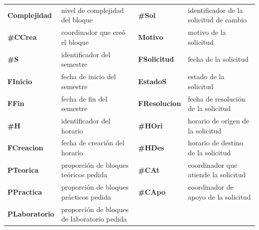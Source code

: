 {\begin{xltabular}{\linewidth}{>{\bfseries}l L{1}>{\bfseries}l L{1}}
Complejidad & nivel de complejidad del bloque & \#Sol & identificador de la solicitud de cambio \\
\#CCrea & coordinador que creó el bloque & Motivo & motivo de la solicitud \\
\#S & identificador del semestre & FSolicitud & fecha de la solicitud \\
FInicio & fecha de inicio del semestre & EstadoS & estado de la solicitud \\
FFin & fecha de fin del semestre & FResolucion & fecha de resolución de la solicitud \\
\#H & identificador del horario & \#HOri & horario de origen de la solicitud \\
FCreacion & fecha de creación del horario & \#HDes & horario de destino de la solicitud \\
PTeorica & proporción de bloques teóricos pedida & \#CAt & coordinador que atiende la solicitud \\
PPractica & proporción de bloques prácticos pedida & \#CApo & coordinador de apoyo de la solicitud \\
PLaboratorio & proporción de bloques de laboratorio pedida &  &  \\
\end{xltabular}}
